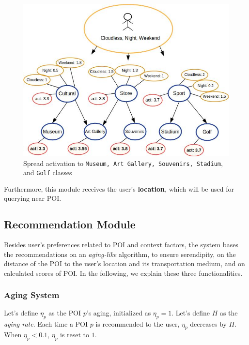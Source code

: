 \begin{figure}[h]
\centering
\includegraphics[scale=0.45]{draws/spread_act.jpg}
\caption{Spread activation to {\tt Museum, Art Gallery, Souvenirs, Stadium}, and {\tt Golf} classes}
\label{fig:spread_act}
\end{figure}

Furthermore, this module receives the user's \textbf{location}, which will be used for querying near POI.

\subsection{Recommendation Module}


Besides user's preferences related to POI and context factors, the system bases the recommendations on  an {\it aging-like} algorithm,  to ensure serendipity, on the distance of the POI to the user's location and its transportation medium, and on calculated scores of POI. In the following, we explain these three functionalities.

\subsubsection{\bf Aging System}

Let's define $\eta_p$ as the POI $p$'s aging, initialized as $\eta_p = 1$. Let's define $H$ as the \textit{aging rate}. Each time a POI $p$ is recommended to the user, $\eta_p$ decreases by $H$. When $\eta_p < 0.1$, $\eta_p$ is reset to $1$. 

